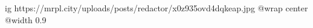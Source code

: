 
 
 
 
 

\ifcmt
  ig https://mrpl.city/uploads/posts/redactor/x0z935ovd4dqkeap.jpg
  @wrap center
  @width 0.9
\fi
